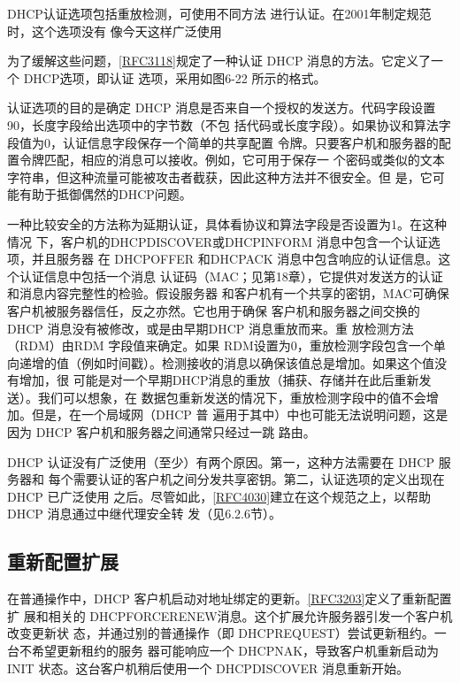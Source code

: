 DHCP认证选项包括重放检测，可使用不同方法
进行认证。在2001年制定规范时，这个选项没有
像今天这样广泛使用

为了缓解这些问题，\href{https://www.rfc-editor.org/rfc/rfc3118}{\href{https://www.rfc-editor.org/rfc/rfc3118}{[RFC3118]}}规定了一种认证
DHCP 消息的方法。它定义了一个 DHCP选项，即认证
选项，采用如图6-22 所示的格式。

认证选项的目的是确定 DHCP
消息是否来自一个授权的发送方。代码字段设置90，长度字段给出选项中的字节数（不包
括代码或长度字段）。如果协议和算法字段值为0，认证信息字段保存一个简单的共享配置
令牌。只要客户机和服务器的配置令牌匹配，相应的消息可以接收。例如，它可用于保存一
个密码或类似的文本字符串，但这种流量可能被攻击者截获，因此这种方法并不很安全。但
是，它可能有助于抵御偶然的DHCP问题。

一种比较安全的方法称为延期认证，具体看协议和算法字段是否设置为1。在这种情况
下，客户机的DHCPDISCOVER或DHCPINFORM 消息中包含一个认证选项，并且服务器
在 DHCPOFFER 和DHCPACK 消息中包含响应的认证信息。这个认证信息中包括一个消息
认证码（MAC；见第18章），它提供对发送方的认证和消息内容完整性的检验。假设服务器
和客户机有一个共享的密钥，MAC可确保客户机被服务器信任，反之亦然。它也用于确保
客户机和服务器之间交换的 DHCP 消息没有被修改，或是由早期DHCP 消息重放而来。重
放检测方法（RDM）由RDM 字段值来确定。如果 RDM设置为0，重放检测字段包含一个单
向递增的值（例如时间戳）。检测接收的消息以确保该值总是增加。如果这个值没有增加，很
可能是对一个早期DHCP消息的重放（捕获、存储并在此后重新发送）。我们可以想象，在
数据包重新发送的情况下，重放检测字段中的值不会增加。但是，在一个局域网（DHCP 普
遍用于其中）中也可能无法说明问题，这是因为 DHCP 客户机和服务器之间通常只经过一跳
路由。

DHCP 认证没有广泛使用（至少）有两个原因。第一，这种方法需要在 DHCP 服务器和
每个需要认证的客户机之间分发共享密钥。第二，认证选项的定义出现在DHCP 已广泛使用
之后。尽管如此，\href{https://www.rfc-editor.org/rfc/rfc4030}{\href{https://www.rfc-editor.org/rfc/rfc4030}{[RFC4030]}}建立在这个规范之上，以帮助DHCP
消息通过中继代理安全转
发（见6.2.6节）。

\subsection{重新配置扩展}
在普通操作中，DHCP
客户机启动对地址绑定的更新。\href{https://www.rfc-editor.org/rfc/rfc3203}{\href{https://www.rfc-editor.org/rfc/rfc3203}{[RFC3203]}}定义了重新配置扩
展和相关的 DHCPFORCERENEW消息。这个扩展允许服务器引发一个客户机改变更新状
态，并通过别的普通操作（即 DHCPREQUEST）尝试更新租约。一台不希望更新租约的服务
器可能响应一个 DHCPNAK，导致客户机重新启动为 INIT 状态。这台客户机稍后使用一个
DHCPDISCOVER 消息重新开始。

